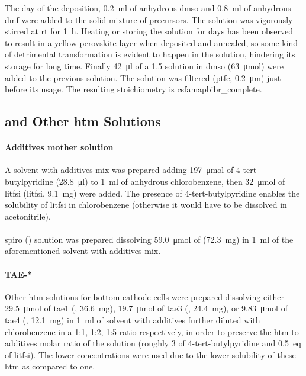 		The day of the deposition, \SI{0.2}{\ml} of anhydrous \gls{dmso} and \SI{0.8}{\ml} of anhydrous \gls{dmf} were added to the solid mixture of precursors. The solution was vigorously stirred at \gls{rt} for \SI{1}{\hour}. Heating or storing the solution for days has been observed to result in a yellow perovskite layer when deposited and annealed, so some kind of detrimental transformation is evident to happen in the solution, hindering its storage for long time. Finally \SI{42}{\ul} of
		a \SI{1.5}{\Molar} \CsI solution in \gls{dmso} (\SI{63}{\umol}) were added to the previous solution. The solution was filtered (\gls{ptfe}, \SI{0.2}{\um}) just before its usage. The resulting stoichiometry is \acrshort{csfamapbibr_complete}.

	\subsection{\Spiro and Other \gls{htm} Solutions}

		\paragraph{Additives mother solution} A solvent with additives mix was prepared adding \SI{197}{\umol} of 4-tert-butylpyridine (\SI{28.8}{\ul}) to \SI{1}{\ml} of anhydrous chlorobenzene, then \SI{32}{\umol} of \glsdesc{litfsi} (\gls{litfsi}, \SI{9.1}{\mg}) were added. The presence of 4-tert-butylpyridine enables the solubility of \gls{litfsi} in chlorobenzene (otherwise it would have to be dissolved in acetonitrile).

		\paragraph{\Spiro} \Glsdesc{spiro} (\spiro) solution was prepared dissolving \SI{59.0}{\umol} of \spiro (\SI{72.3}{\mg}) in \SI{1}{\ml} of the aforementioned solvent with additives mix.

		\paragraph{TAE-*} Other \gls{htm} solutions for bottom cathode cells were prepared dissolving either \SI{29.5}{\umol} of \glsdesc{tae1} (, \SI{36.6}{\mg}), \SI{19.7}{\umol} of \glsdesc{tae3} (, \SI{24.4}{\mg}), or \SI{9.83}{\umol} of \glsdesc{tae4} (, \SI{12.1}{\mg}) in \SI{1}{\ml} of solvent with additives further diluted with chlorobenzene in a 1:1, 1:2, 1:5 ratio respectively, in order to preserve the \gls{htm} to additives molar ratio of the \spiro solution (roughly \SI{3}{\eq} of 4-tert-butylpyridine and \SI{0.5}{eq} of \gls{litfsi}). The lower concentrations were used due to the lower solubility of these \gls{htm} as compared to \spiro one.

